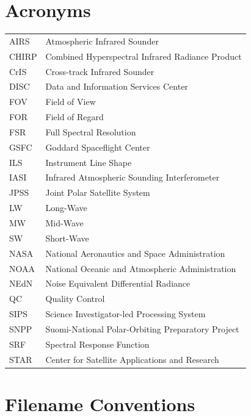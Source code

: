 \documentclass[11pt]{article}
\begin{document}



\appendix
\section{Acronyms}

\begin{center}
\begin{tabular}{ m{2cm} m{10cm} }
AIRS    & Atmospheric Infrared Sounder \\
CHIRP   & Combined Hyperspectral Infrared Radiance Product \\
CrIS    & Cross-track Infrared Sounder \\
DISC    & Data and Information Services Center \\
FOV     & Field of View \\
FOR     & Field of Regard \\
FSR     & Full Spectral Resolution \\
GSFC    & Goddard Spaceflight Center \\
ILS     & Instrument Line Shape \\
IASI    & Infrared Atmospheric Sounding Interferometer \\
JPSS    & Joint Polar Satellite System \\
LW      & Long-Wave \\
MW      & Mid-Wave \\
SW      & Short-Wave \\
NASA    & National Aeronautics and Space Administration \\
NOAA    & National Oceanic and Atmospheric Administration \\
NEdN    & Noise Equivalent Differential Radiance \\
QC      & Quality Control \\
SIPS    & Science Investigator-led Processing System \\
SNPP    & Suomi-National Polar-Orbiting Preparatory Project \\
SRF     & Spectral Response Function \\
STAR    & Center for Satellite Applications and Research \\
\end{tabular}
\end{center}

\section{Filename Conventions}
\end{document}

